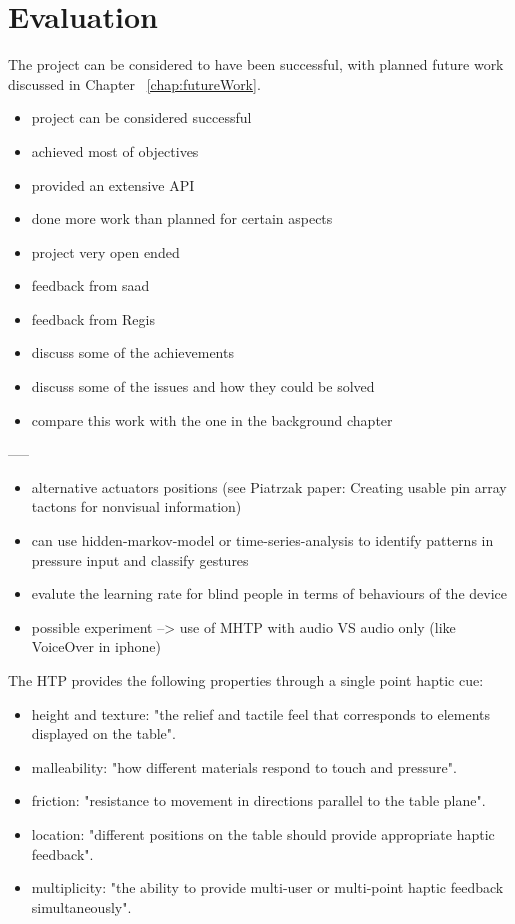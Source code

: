 \chapter{Evaluation}

The project can be considered to have been successful, with planned future work discussed in Chapter ~\ref{chap:futureWork}.


\begin{itemize}
	\item project can be considered successful
    \item achieved most of objectives
    \item provided an extensive API
    \item done more work than planned for certain aspects
    \item project very open ended
    \item feedback from saad
    \item feedback from Regis
    \item discuss some of the achievements
    \item discuss some of the issues and how they could be solved
    \item compare this work with the one in the background chapter
\end{itemize}


-----

\begin{itemize}
    \item alternative actuators positions (see Piatrzak paper: Creating usable pin array tactons for nonvisual information)
    \item can use hidden-markov-model or time-series-analysis to identify patterns in pressure input and classify gestures
    \item evalute the learning rate for blind people in terms of behaviours of the device
    \item possible experiment --> use of MHTP with audio VS audio only (like VoiceOver in iphone)
\end{itemize}

The HTP provides the following properties through a single point haptic cue:
\begin{itemize}
	\item height and texture: "the relief and tactile feel that corresponds to elements displayed on the table".
    \item malleability: "how different materials respond to touch and pressure".
    \item friction: "resistance to movement in directions parallel to the table plane".
    \item location: "different positions on the table should provide appropriate haptic feedback".
    \item multiplicity: "the ability to provide multi-user or multi-point haptic feedback simultaneously". \cite{marquardt2009haptic}
\end{itemize}

